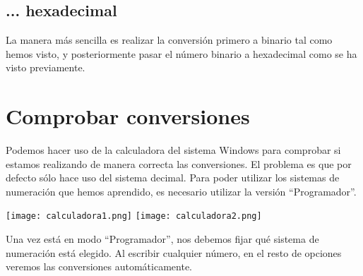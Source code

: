 \subsection*{... hexadecimal}
La manera más sencilla es realizar la conversión primero a binario tal como hemos visto, y posteriormente pasar el número binario a hexadecimal como se ha visto previamente.

\section{Comprobar conversiones}

Podemos hacer uso de la calculadora del sistema Windows para comprobar si estamos realizando de manera correcta las conversiones. El problema es que por defecto sólo hace uso del sistema decimal. Para poder utilizar los sistemas de numeración que hemos aprendido, es necesario utilizar la versión “Programador”.

\begin{center}
    \texttt{[image: calculadora1.png]}
    \hfill
    \texttt{[image: calculadora2.png]}
\end{center}

Una vez está en modo “Programador”, nos debemos fijar qué sistema de numeración está elegido. Al escribir cualquier número, en el resto de opciones veremos las conversiones automáticamente.